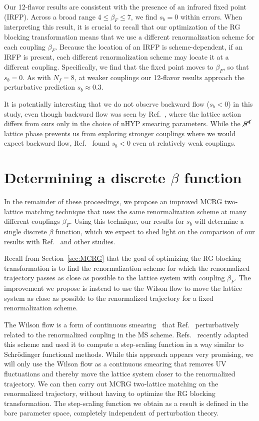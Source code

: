 \documentclass{PoS}
\newcommand{\be}{\ensuremath{\beta} }
\newcommand{\Sb}{\ensuremath{\cancel{S^4}} }
\newcommand{\MSbar}{\ensuremath{\overline{\textrm{MS}}} }
\newcommand{\refcite}[1]{Ref.~\cite{#1}}
\newcommand{\secref}[1]{Section~\ref{#1}}
\begin{document}
Our 12-flavor results are consistent with the presence of an infrared fixed point (IRFP).
Across a broad range $4 \leq \be_F \leq 7$, we find $s_b = 0$ within errors.
When interpreting this result, it is crucial to recall that our optimization of the RG blocking transformation means that we use a different renormalization scheme for each coupling $\be_F$.
Because the location of an IRFP is scheme-dependent, if an IRFP is present, each different renormalization scheme may locate it at a different coupling.
Specifically, we find that the fixed point moves to $\be_F$, so that $s_b = 0$.
As with $N_f = 8$, at weaker couplings our 12-flavor results approach the perturbative prediction $s_b \approx 0.3$.

It is potentially interesting that we do not observe backward flow ($s_b < 0$) in this study, even though backward flow was seen by \refcite{Hasenfratz:2011xn}, where the lattice action differs from ours only in the choice of nHYP smearing parameters.
While the \Sb lattice phase prevents us from exploring stronger couplings where we would expect backward flow, \refcite{Hasenfratz:2011xn} found $s_b < 0$ even at relatively weak couplings.



\section{\label{sec:Wflow}Determining a discrete \be function} %
In the remainder of these proceedings, we propose an improved MCRG two-lattice matching technique that uses the same renormalization scheme at many different couplings $\be_F$.
Using this technique, our results for $s_b$ will determine a single discrete \be function, which we expect to shed light on the comparison of our results with \refcite{Hasenfratz:2011xn} and other studies.

Recall from \secref{sec:MCRG} that the goal of optimizing the RG blocking transformation is to find the renormalization scheme for which the renormalized trajectory passes as close as possible to the lattice system with coupling $\be_F$.
The improvement we propose is instead to use the Wilson flow to move the lattice system as close as possible to the renormalized trajectory for a fixed renormalization scheme.

The Wilson flow is a form of continuous smearing~\cite{Narayanan:2006rf} that \refcite{Luscher:2010iy} perturbatively related to the renormalized coupling in the \MSbar scheme.
Refs.~\cite{Fodor:2012td, Fodor:2012qh} recently adapted this scheme and used it to compute a step-scaling function in a way similar to Schr\"odinger functional methods.
While this approach appears very promising, we will only use the Wilson flow as a continuous smearing that removes UV fluctuations and thereby move the lattice system closer to the renormalized trajectory.
We can then carry out MCRG two-lattice matching on the renormalized trajectory, without having to optimize the RG blocking transformation.
The step-scaling function we obtain as a result is defined in the bare parameter space, completely independent of perturbation theory.
\end{document}

